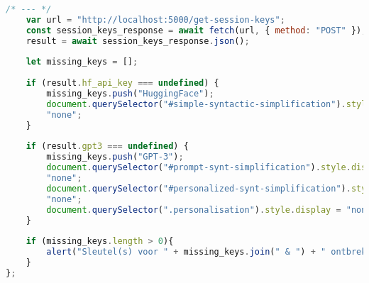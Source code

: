 \begin{lstlisting}[language=JavaScript, caption={De toegepaste scripts voor enkel het scholierencomponent.}, label={code:js-scholars}]
	/* --- */
	var url = "http://localhost:5000/get-session-keys";
	const session_keys_response = await fetch(url, { method: "POST" });
	result = await session_keys_response.json();
	
	let missing_keys = [];
	
	if (result.hf_api_key === undefined) {
		missing_keys.push("HuggingFace");
		document.querySelector("#simple-syntactic-simplification").style.display =
		"none";
	}
	
	if (result.gpt3 === undefined) {
		missing_keys.push("GPT-3");
		document.querySelector("#prompt-synt-simplification").style.display =
		"none";
		document.querySelector("#personalized-synt-simplification").style.display =
		"none";
		document.querySelector(".personalisation").style.display = "none";
	}
	
	if (missing_keys.length > 0){
		alert("Sleutel(s) voor " + missing_keys.join(" & ") + " ontbreken.");
	}
};

\end{lstlisting}

